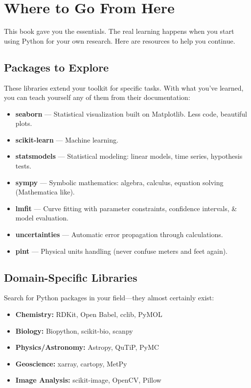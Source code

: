 
\section{Where to Go From Here}
\label{sec:next-steps}

This book gave you the essentials. The real learning happens when you start using Python for your own research. Here are resources to help you continue.

\subsection{Packages to Explore}

These libraries extend your toolkit for specific tasks. With what you've learned, you can teach yourself any of them from their documentation:

\begin{itemize}
    \item \textbf{seaborn} --- Statistical visualization built on Matplotlib. Less code, beautiful plots.
    \item \textbf{scikit-learn} --- Machine learning.
    \item \textbf{statsmodels} --- Statistical modeling: linear models, time series, hypothesis tests.
    \item \textbf{sympy} --- Symbolic mathematics: algebra, calculus, equation solving (Mathematica like).
    \item \textbf{lmfit} --- Curve fitting with parameter constraints, confidence intervals, \& model evaluation.
    \item \textbf{uncertainties} --- Automatic error propagation through calculations.
    \item \textbf{pint} --- Physical units handling (never confuse meters and feet again).
\end{itemize}

\subsection{Domain-Specific Libraries}

Search for Python packages in your field---they almost certainly exist:
\begin{itemize}
    \item \textbf{Chemistry:} RDKit, Open Babel, cclib, PyMOL
    \item \textbf{Biology:} Biopython, scikit-bio, scanpy
    \item \textbf{Physics/Astronomy:} Astropy, QuTiP, PyMC
    \item \textbf{Geoscience:} xarray, cartopy, MetPy
    \item \textbf{Image Analysis:} scikit-image, OpenCV, Pillow
\end{itemize}

